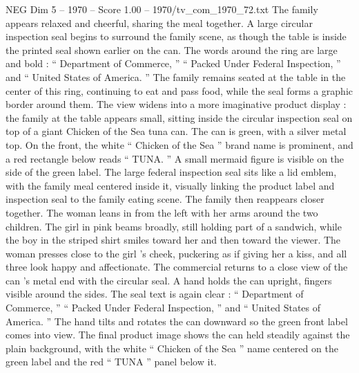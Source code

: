\begin{textsample}{NEG Dim 5 – 1970 – Score 1.00 – 1970/tv\_com\_1970\_72.txt}
The family appears relaxed and cheerful, sharing the meal together.
A large circular inspection seal begins to surround the family scene, as though the table is inside the printed seal shown earlier on the can.
The words around the ring are large and bold : “ Department of Commerce, ” “ Packed Under Federal Inspection, ” and “ United States of America. ” The family remains seated at the table in the center of this ring, continuing to eat and pass food, while the seal forms a graphic border around them.
The view widens into a more imaginative product display : the family at the table appears small, sitting inside the circular inspection seal on top of a giant Chicken of the Sea tuna can.
The can is green, with a silver metal top.
On the front, the white “ Chicken of the Sea ” brand name is prominent, and a red rectangle below reads “ TUNA. ” A small mermaid figure is visible on the side of the green label.
The large federal inspection seal sits like a lid emblem, with the family meal centered inside it, visually linking the product label and inspection seal to the family eating scene.
The family then reappears closer together.
The woman leans in from the left with her arms around the two children.
The girl in pink beams broadly, still holding part of a sandwich, while the boy in the striped shirt smiles toward her and then toward the viewer.
The woman presses close to the girl ’s cheek, puckering as if giving her a kiss, and all three look happy and affectionate.
The commercial returns to a close view of the can ’s metal end with the circular seal.
A hand holds the can upright, fingers visible around the sides.
The seal text is again clear : “ Department of Commerce, ” “ Packed Under Federal Inspection, ” and “ United States of America. ” The hand tilts and rotates the can downward so the green front label comes into view.
The final product image shows the can held steadily against the plain background, with the white “ Chicken of the Sea ” name centered on the green label and the red “ TUNA ” panel below it.

\end{textsample}

